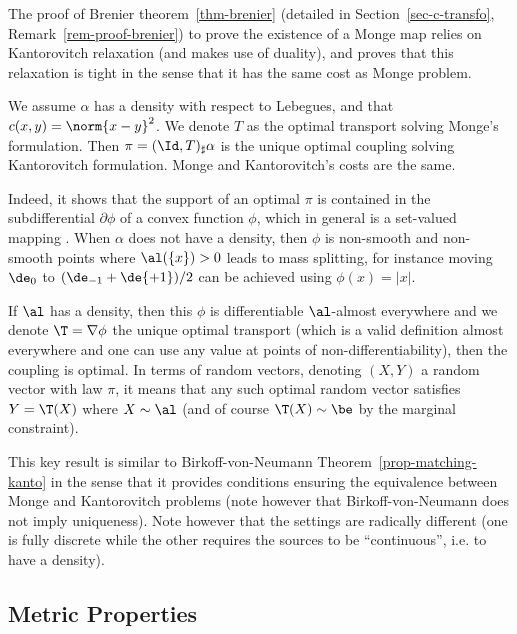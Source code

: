 The proof of Brenier theorem~\ref{thm-brenier}  (detailed in Section~\ref{sec-c-transfo}, Remark~\ref{rem-proof-brenier}) to prove the existence of a Monge map relies on Kantorovitch relaxation (and makes use of duality), and proves that this relaxation is tight in the sense that it has the same cost as Monge problem. 

\begin{cor}
	We assume $\alpha$ has a density with respect to Lebegues, and that $c(x,y)=\norm{x-y}^2$. We denote $T$ as the optimal transport solving Monge's formulation. Then $\pi=(\Id,T)_\sharp \alpha$ is the unique optimal coupling solving Kantorovitch formulation. Monge and Kantorovitch's costs are the same.
\end{cor}

Indeed, it shows that the support of an optimal $\pi$ is contained in the subdifferential $\partial \phi$ of a convex function $\phi$, which in general is a set-valued mapping .
%
When $\alpha$ does not have a density, then $\phi$ is non-smooth and non-smooth points where $\al(\{x\})>0$ leads to mass splitting, for instance moving $\de_{0}$ to $(\de_{-1}+\de{+1})/2$ can be achieved using $\phi(x)=|x|$.  

If $\al$ has a density, then this $\phi$ is differentiable $\al$-almost everywhere and we denote $\T=\nabla\phi$ the unique optimal transport (which is a valid definition almost everywhere and one can use any value at points of non-differentiability), then the coupling 
is optimal. In terms of random vectors, denoting $(X,Y)$ a random vector with law $\pi$, it means that any such optimal random vector satisfies $Y=\T(X)$ where $X \sim \al$ (and of course $\T(X) \sim \be$ by the marginal constraint). 

This key result is similar to Birkoff-von-Neumann Theorem~\ref{prop-matching-kanto} in the sense that it provides conditions ensuring the equivalence between Monge and Kantorovitch problems (note however that Birkoff-von-Neumann does not imply uniqueness). Note however that the settings are radically different (one is fully discrete while the other requires the sources to be ``continuous'', i.e. to have a density).


\subsection{Metric Properties}

